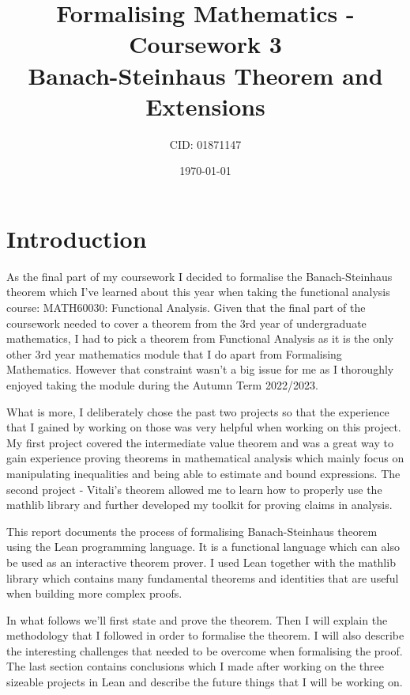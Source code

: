\documentclass[11pt]{article}
\begin{document}
\title{Formalising Mathematics - Coursework 3 \\ Banach-Steinhaus Theorem and Extensions}
\date{\today}
\author{CID: 01871147}
\maketitle

\section*{Introduction}

As the final part of my coursework I decided to formalise the Banach-Steinhaus theorem
which I've learned about this year when taking the functional analysis course:
MATH60030: Functional Analysis. Given that the final part of the coursework needed
to cover a theorem from the 3rd year of undergraduate mathematics, I had to pick
a theorem from Functional Analysis as it is the only other 3rd year mathematics
module that I do apart from Formalising Mathematics. However that constraint wasn't
a big issue for me as I thoroughly enjoyed taking the module during the Autumn Term
2022/2023.

What is more, I deliberately chose the past two projects so that the experience
that I gained by working on those was very helpful when working on this project.
My first project covered the intermediate value theorem and was a great way to
gain experience proving theorems in mathematical analysis which mainly focus on
manipulating inequalities and being able to estimate and bound expressions. The
second project - Vitali's theorem allowed me to learn how to properly use the mathlib
library and further developed my toolkit for proving claims in analysis.

This report documents the process of formalising Banach-Steinhaus theorem using the Lean programming language.
It is a functional language which can also be used as an interactive theorem prover. I used Lean together
with the mathlib library which contains many fundamental theorems and identities that are useful when
building more complex proofs.

In what follows we'll first state and prove the theorem. Then I will explain the
methodology that I followed in order to formalise the theorem. I will also describe
the interesting challenges that needed to be overcome when formalising the proof.
The last section contains conclusions which I made after working on the three sizeable
projects in Lean and describe the future things that I will be working on.
\end{document}
